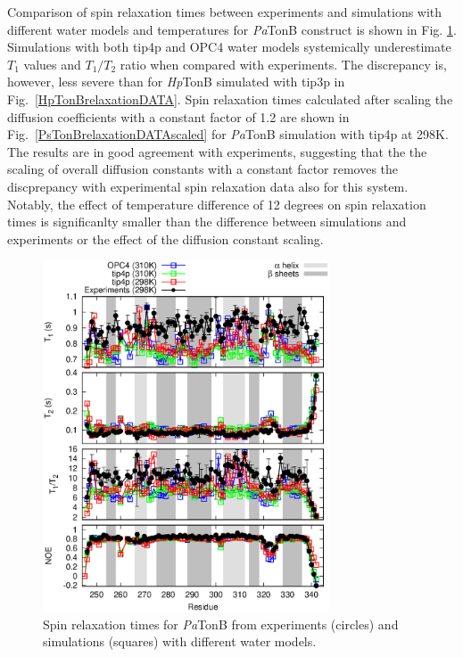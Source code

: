 \documentclass[pre,aps,floatfix,authordate1-4,twocolumn]{revtex4-1}
\begin{document}
Comparison of spin relaxation times between experiments and simulations
with different water models and temperatures
for {\it Pa}TonB construct is shown in Fig. \ref{PsTonBrelaxationDATA}.
Simulations with both tip4p and
OPC4 water models systemically underestimate $T_1$ values
and $T_1/T_2$ ratio when compared with experiments. The discrepancy is,
however, less severe than for {\it Hp}TonB simulated with tip3p in Fig.~\ref{HpTonBrelaxationDATA}. 
Spin relaxation times calculated
after scaling the diffusion coefficients with a constant factor of 1.2
are shown in Fig.~\ref{PsTonBrelaxationDATAscaled} for {\it Pa}TonB simulation with tip4p at 298K.
The results are in good agreement with experiments, suggesting that
the the scaling of overall diffusion constants with a constant factor 
removes the discprepancy with experimental spin relaxation data
also for this system.
Notably, the effect of temperature difference of 12 degrees
on spin relaxation times is significanlty smaller than the difference
between simulations and experiments or the effect of the diffusion constant scaling.
\begin{figure}[!h]
  \includegraphics[width=8.5cm]{../Figs/PsTonBrelaxationDATA.eps}%
  \caption{Spin relaxation times for {\it Pa}TonB from experiments (circles) \cite{??}
    and simulations (squares) with different water models. 
    \label{PsTonBrelaxationDATA}}%
\end{figure}
\end{document}
